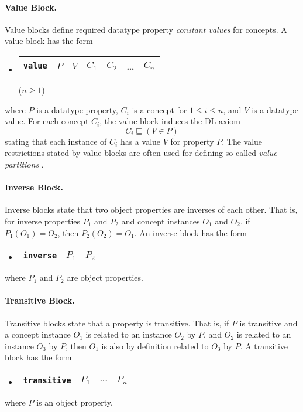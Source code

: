 \documentclass[11pt,onecolumn]{article}
\begin{document}
\paragraph{Value Block.} Value blocks define required datatype
property \emph{constant values} for concepts. A value block has the
form
\begin{itemize}
\item[]
  \begin{tabular}{|l|l|l|l|l|l|l|}\hline \texttt{value} & $P$ & $V$ & $C_1$
    & $C_2$ & \dots & $C_n$ \\ \hline
  \end{tabular} \hfill ($n \ge 1$)
\end{itemize}
where $P$ is a datatype property, $C_i$ is a concept for $1 \le i \le
n$, and $V$ is a datatype value. For each concept $C_i$, the value
block induces the DL axiom \[C_i \sqsubseteq (V \in P)\] stating that
each instance of $C_i$ has a value $V$ for property $P$.  The value
restrictions stated by value blocks are often used for defining
so-called \emph{value partitions} \cite{co-ode}.

\paragraph{Inverse Block.} Inverse blocks state that two object
properties are inverses of each other. That is, for inverse properties
$P_1$ and $P_2$ and concept instances $O_1$ and $O_2$, if $P_1(O_1) =
O_2$, then $P_2(O_2) = O_1$.  An inverse block has the form
\begin{itemize}
\item[]
  \begin{tabular}{|l|l|l|}\hline \texttt{inverse} & $P_1$ & $P_2$
\\ \hline
  \end{tabular}
\end{itemize}
where $P_1$ and $P_2$ are object properties. 

\paragraph{Transitive Block.} Transitive blocks state that a property
is transitive. That is, if $P$ is transitive and a concept instance
$O_1$ is related to an instance $O_2$ by $P$, and $O_2$ is related to
an instance $O_3$ by $P$, then $O_1$ is also by definition related to
$O_3$ by $P$. A transitive block has the form
\begin{itemize}
\item[]
  \begin{tabular}{|l|l|l|l|}\hline \texttt{transitive} & $P_1$ &
    $\dots$ & $P_n$
\\ \hline
  \end{tabular}
\end{itemize}
where $P$ is an object property. 
\end{document}
